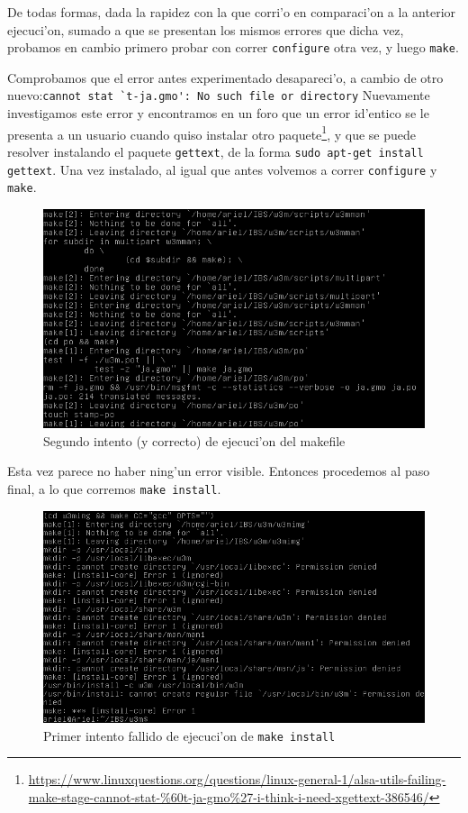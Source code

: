 \documentclass[11pt]{article}
\begin{document}
	De todas formas, dada la rapidez con la que corri'o en comparaci'on a la anterior ejecuci'on, sumado a que se presentan los mismos errores que dicha vez, probamos en cambio primero probar con correr \texttt{configure} otra vez, y luego \texttt{make}.
	
	
	Comprobamos que el error antes experimentado desapareci'o, a cambio de otro nuevo:\enspace\verb|cannot stat `t-ja.gmo': No such file or directory| Nuevamente investigamos este error y encontramos en un foro que un error id'entico se le presenta a un usuario cuando quiso instalar otro paquete\footnote{ \url{https://www.linuxquestions.org/questions/linux-general-1/alsa-utils-failing-make-stage-cannot-stat-\%60t-ja-gmo\%27-i-think-i-need-xgettext-386546/}}, y que se puede resolver instalando el paquete \texttt{gettext}, de la forma \texttt{sudo apt-get install gettext}. Una vez instalado, al igual que antes volvemos a correr \texttt{configure} y \texttt{make}.
	
	\begin{figure}[H]
		\centering \captionsetup{justification=centering}
		\includegraphics[width=.8\linewidth]{Images/Compile_w3m/make_successful}
		\caption{Segundo intento (y correcto) de ejecuci'on del makefile}
	\end{figure}
	
	Esta vez parece no haber ning'un error visible. Entonces procedemos al paso final, a lo que corremos \texttt{make install}.
	
	\begin{figure}[H]
		\centering \captionsetup{justification=centering}
		\includegraphics[width=.8\linewidth]{Images/Compile_w3m/make-install_fail}
		\caption{Primer intento fallido de ejecuci'on de \texttt{make install}}
	\end{figure}
	
\end{document}
